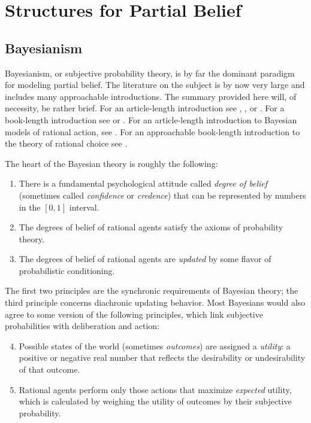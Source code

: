   
\section{Structures for Partial Belief}
\subsection{Bayesianism}

Bayesianism, or subjective probability theory, is by far the dominant paradigm
for modeling partial belief. The literature on the subject is by now very large
and includes many approachable introductions. The summary provided here will, of
necessity, be rather brief. For an article-length introduction see
\citet{sep-formal-belief}, \citet{easwaran2011bayesA,easwaran2011bayesB}, or
\citet{weisberg2011varieties}. For a book-length introduction see
\citet{earman1992bayes} or \citet{howson2006scientific}. For an article-length
introduction to Bayesian models of rational action, see
\citet{sep-rationality-normative-utility}. For an approachable book-length
introduction to the theory of rational choice see \citet{resnik1987choices}. 

The heart of the Bayesian theory is roughly the following:
\begin{enumerate}
  \item There is a fundamental psychological attitude called {\em degree of
  belief} (sometimes called {\em confidence} or {\em credence}) that can be
  represented by numbers in the $[0,1]$ interval.
  \item The degrees of belief of rational agents satisfy the axioms of
  probability theory.
  \item The degrees of belief of rational agents are {\em updated} by some
  flavor of probabilistic conditioning.
\end{enumerate}
The first two principles are the synchronic requirements of Bayesian theory; the
third principle concerns diachronic updating behavior. Most Bayesians would also
agree to some version of the following principles, which link subjective
probabilities with deliberation and action:
\begin{enumerate}\setcounter{enumi}{3}
  \item Possible states of the world (sometimes {\em outcomes}) are assigned a
  {\em utility}: a positive or negative real number that reflects the
  desirability or undesirability of that outcome.
  \item Rational agents perform only those actions that maximize {\em expected}
  utility, which is calculated by weighing the utility of outcomes by their
  subjective probability.
\end{enumerate}


